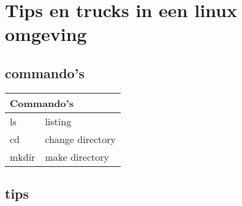 \chapter{Tips en trucks in een linux omgeving } \label{app:linux}

\section{commando's}

\begin{table}[h!]
	\begin{tabular}{|l|l|}
		\hline
		\multicolumn{2}{|l|}{Commando's}    \\ \hline
		ls & listing \\ \hline
		cd & change directory \\ \hline
	    mkdir & make directory \\ \hline
	\end{tabular}
\end{table}

\section{tips}
